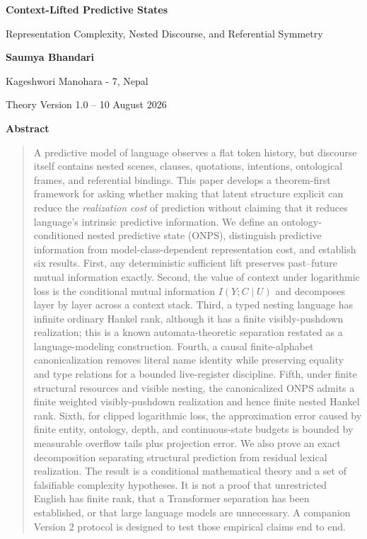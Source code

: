 \documentclass[11pt]{article}
\begin{document}
\thispagestyle{plain}
\begin{center}
  {\LARGE\bfseries Context-Lifted Predictive States\par}
  \vspace{0.45em}
  {\large Representation Complexity, Nested Discourse, and Referential Symmetry\par}
  \vspace{2.0em}
  {\large\bfseries Saumya Bhandari\par}
  {\large Kageshwori Manohara - 7, Nepal\par}
  \vspace{1.25em}
  {\large Theory Version 1.0 -- 10 August 2026\par}
\end{center}
\vspace{1.2em}

\begin{center}\textbf{Abstract}\end{center}
\begin{quotation}\small
A predictive model of language observes a flat token history, but discourse itself contains nested scenes, clauses, quotations, intentions, ontological frames, and referential bindings. This paper develops a theorem-first framework for asking whether making that latent structure explicit can reduce the \emph{realization cost} of prediction without claiming that it reduces language's intrinsic predictive information. We define an ontology-conditioned nested predictive state (ONPS), distinguish predictive information from model-class-dependent representation cost, and establish six results. First, any deterministic sufficient lift preserves past--future mutual information exactly. Second, the value of context under logarithmic loss is the conditional mutual information \(I(Y;C\mid U)\) and decomposes layer by layer across a context stack. Third, a typed nesting language has infinite ordinary Hankel rank, although it has a finite visibly-pushdown realization; this is a known automata-theoretic separation restated as a language-modeling construction. Fourth, a causal finite-alphabet canonicalization removes literal name identity while preserving equality and type relations for a bounded live-register discipline. Fifth, under finite structural resources and visible nesting, the canonicalized ONPS admits a finite weighted visibly-pushdown realization and hence finite nested Hankel rank. Sixth, for clipped logarithmic loss, the approximation error caused by finite entity, ontology, depth, and continuous-state budgets is bounded by measurable overflow tails plus projection error. We also prove an exact decomposition separating structural prediction from residual lexical realization. The result is a conditional mathematical theory and a set of falsifiable complexity hypotheses. It is not a proof that unrestricted English has finite rank, that a Transformer separation has been established, or that large language models are unnecessary. A companion Version 2 protocol is designed to test those empirical claims end to end.
\end{quotation}
\end{document}
